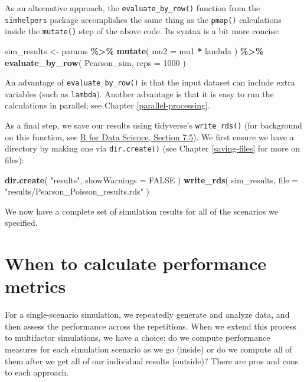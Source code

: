 \documentclass[
]{book}
\newenvironment{Shaded}{\begin{snugshade}}{\end{snugshade}}
\newcommand{\AttributeTok}[1]{\textcolor[rgb]{0.13,0.29,0.53}{#1}}
\newcommand{\ConstantTok}[1]{\textcolor[rgb]{0.56,0.35,0.01}{#1}}
\newcommand{\DecValTok}[1]{\textcolor[rgb]{0.00,0.00,0.81}{#1}}
\newcommand{\FunctionTok}[1]{\textcolor[rgb]{0.13,0.29,0.53}{\textbf{#1}}}
\newcommand{\NormalTok}[1]{#1}
\newcommand{\OtherTok}[1]{\textcolor[rgb]{0.56,0.35,0.01}{#1}}
\newcommand{\SpecialCharTok}[1]{\textcolor[rgb]{0.81,0.36,0.00}{\textbf{#1}}}
\newcommand{\StringTok}[1]{\textcolor[rgb]{0.31,0.60,0.02}{#1}}
\begin{document}
As an alternative approach, the \texttt{evaluate\_by\_row()} function from the \texttt{simhelpers} package accomplishes the same thing as the \texttt{pmap()} calculations inside the \texttt{mutate()} step of the above code. Its syntax is a bit more concise:

\begin{Shaded}
\begin{Highlighting}[]
\NormalTok{sim\_results }\OtherTok{\textless{}{-}} 
\NormalTok{  params }\SpecialCharTok{\%\textgreater{}\%}
  \FunctionTok{mutate}\NormalTok{( }\AttributeTok{mu2 =}\NormalTok{ mu1 }\SpecialCharTok{*}\NormalTok{ lambda ) }\SpecialCharTok{\%\textgreater{}\%}
  \FunctionTok{evaluate\_by\_row}\NormalTok{( Pearson\_sim, }\AttributeTok{reps =} \DecValTok{1000}\NormalTok{ )}
\end{Highlighting}
\end{Shaded}

An advantage of \texttt{evaluate\_by\_row()} is that the input dataset can include extra variables (such as \texttt{lambda}).
Another advantage is that it is easy to run the calculations in parallel; see Chapter \ref{parallel-processing}.

As a final step, we save our results using tidyverse's \texttt{write\_rds()} (for background on this function, see \href{https://r4ds.hadley.nz/data-import.html\#sec-writing-to-a-file}{R for Data Science, Section 7.5}).
We first ensure we have a directory by making one via \texttt{dir.create()} (see Chapter \ref{saving-files} for more on files):

\begin{Shaded}
\begin{Highlighting}[]
\FunctionTok{dir.create}\NormalTok{( }\StringTok{"results"}\NormalTok{, }\AttributeTok{showWarnings =} \ConstantTok{FALSE}\NormalTok{ )}
\FunctionTok{write\_rds}\NormalTok{( sim\_results, }\AttributeTok{file =} \StringTok{"results/Pearson\_Poisson\_results.rds"}\NormalTok{ )}
\end{Highlighting}
\end{Shaded}

We now have a complete set of simulation results for all of the scenarios we specified.

\section{When to calculate performance metrics}\label{when-to-calculate-performance-metrics}

For a single-scenario simulation, we repeatedly generate and analyze data, and then assess the performance across the repetitions.
When we extend this process to multifactor simulations, we have a choice: do we compute performance measures for each simulation scenario as we go (inside) or do we compute all of them after we get all of our individual results (outside)?
There are pros and cons to each approach.
\end{document}
